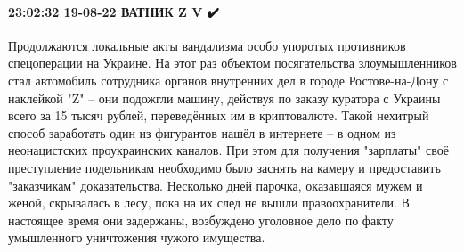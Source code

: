  
 
 
 
 

\paragraph{23:02:32 19-08-22 ВАТНИК Z V ✔️}

Продолжаются локальные акты вандализма особо упоротых противников спецоперации на Украине.
На этот раз объектом посягательства злоумышленников стал автомобиль сотрудника органов внутренних дел в городе Ростове-на-Дону с наклейкой "Z" – они подожгли машину, действуя по заказу куратора с Украины всего за 15 тысяч рублей, переведённых им в криптовалюте. Такой нехитрый способ заработать один из фигурантов нашёл в интернете – в одном из неонацистских проукраинских каналов. При этом для получения "зарплаты" своё преступление подельникам необходимо было заснять на камеру и предоставить "заказчикам" доказательства.
Несколько дней парочка, оказавшаяся мужем и женой, скрывалась в лесу, пока на их след не вышли правоохранители. В настоящее время они задержаны, возбуждено уголовное дело по факту умышленного уничтожения чужого имущества.
